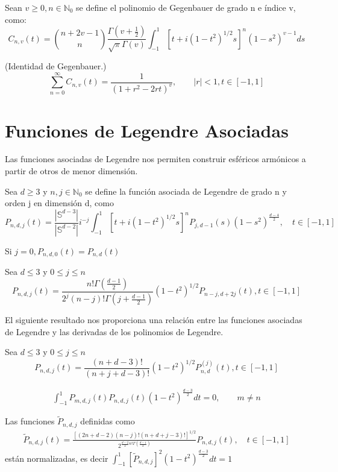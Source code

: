 \begin{defn}Sean $v\ge 0,n\in\mathds{N}_0$ se define el polinomio de Gegenbauer de grado n e índice v, como:
	$$C_{n,v}(t) = \binom{n+2v-1}{n}\frac{\Gamma(v+\frac{1}{2})}{\sqrt{\pi}\Gamma(v)}\int_{-1}^{1}\left[t+i(1-t^2)^{1/2}s\right]^n (1-s^2)^{v-1} ds$$ 
\end{defn}
\begin{prop}(Identidad de Gegenbauer.)$$
	\sum_{n=0}^{\infty} C_{n,v}(t) = \frac{1}{(1+r^2-2rt)^v}, \qquad |r|<1, t\in[-1,1]$$
\end{prop}
\chapter{Funciones de Legendre Asociadas}\label{aped.E}
Las funciones asociadas de Legendre nos permiten construir esféricos armónicos a partir de otros de menor dimensión.
\begin{defn}Sea $d\ge3$ y $n,j \in \mathds{N}_0$ se define la función asociada de Legendre de grado n y orden j en dimensión d, como
	$$
	P_{n,d,j}(t) = \frac{|\mathds{S}^{d-3}|}{|\mathds{S}^{d-2}|}i^{-j} \int_{-1}^{1}\left[t+i(1-t^2)^{1/2}s\right]^n P_{j,d-1}(s)(1-s^2)^{\frac{d-4}{2}}, \quad t\in[-1,1]
	$$
\end{defn}
\begin{rem}Si $j=0, P_{n,d,0}(t)=P_{n,d}(t)$
\end{rem}
\begin{prop}Sea $d\le3$ y $0\le j \le n$ 
	$$	P_{n,d,j}(t) = \frac{n!\Gamma(\frac{d-1}{2})}{2^j(n-j)!\Gamma(j+\frac{d-1}{2})}(1-t^2)^{1/2} P_{n-j,d+2j}(t), t\in[-1,1]$$
\end{prop}
El siguiente resultado nos proporciona una relación entre las funciones asociadas de Legendre y las derivadas de los polinomios de Legendre.
\begin{prop}Sea $d\le3$ y $0\le j \le n$ 
	$$	P_{n,d,j}(t) = \frac{(n+d-3)!}{(n+j+d-3)!}(1-t^2)^{1/2} P^{(j)}_{n,d}(t), t\in[-1,1]$$
\end{prop}
\begin{prop}
	\begin{gather*}
	\int_{-1}^{1} P_{m,d,j}(t)P_{n,d,j}(t)(1-t^2)^{\frac{d-3}{2}} dt = 0, \qquad m \neq n
	\end{gather*}
\end{prop}
\begin{prop} Las funciones $\tilde{P}_{n,d,j}$ definidas como
	\begin{gather*}
		\tilde{P}_{n,d,j}(t) = \frac{[(2n+d-2)(n-j)!(n+d+j-3)!]^{1/2}}{2^{\frac{d-2}{2}n!\Gamma(\frac{d-1}{2})}}P_{n,d,j}(t), \quad t\in[-1,1]
	\end{gather*}
están normalizadas, es decir $\int_{-1}^{1} [	\tilde{P}_{n,d,j}]^2(1-t^2)^\frac{d-3}{2} dt = 1$
\end{prop}
